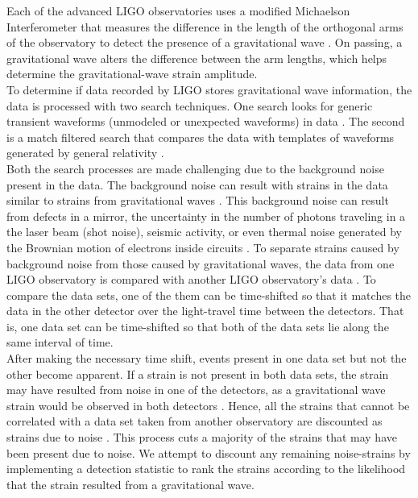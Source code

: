 \documentclass{article}
\begin{document}
 
 
 
 \indent Each of the advanced LIGO observatories uses a modified Michaelson Interferometer that measures the difference in the length of the orthogonal arms of the observatory to detect the presence of a gravitational wave \cite{DetectionPaper}. On passing, a gravitational wave alters the difference between the arm lengths, which helps determine the gravitational-wave strain amplitude. \\
  
  
  
  \indent To determine if data recorded by LIGO stores gravitational wave information, the data is processed with two search techniques. One search looks for generic transient waveforms (unmodeled or unexpected waveforms) in data \cite{Enia}. The second is a match filtered search that compares the data with templates of waveforms generated by general relativity \cite{Enia}.\\
  
  
  \indent Both the search processes are made challenging due to the background noise present in the data. The background noise can result with strains in the data similar to strains from gravitational waves \cite{DetectionPaper}. This background noise can result from defects in a mirror, the uncertainty in the number of photons traveling in a the laser beam (shot noise), seismic activity, or even thermal noise generated by the Brownian motion of electrons inside circuits \cite{RSmith}. To separate  strains caused by background noise from those caused by gravitational waves, the data from one LIGO observatory is compared with another LIGO observatory's data \cite{DetectionPaper}. To compare the data sets, one of the them can be time-shifted so that it matches the data in the other detector over the light-travel time between the detectors. That is, one data set can be time-shifted so that both of the data sets lie along the same interval of time.\\
  
  After making the necessary time shift, events present in one data set but not the other become apparent. If a strain is not present in both data sets, the strain may have resulted from noise in one of the detectors, as a gravitational wave strain would be observed in both detectors \cite{DetectionPaper}. Hence, all the strains that cannot be correlated with a data set taken from another observatory are discounted as strains due to noise \cite{DetectionPaper}. This process cuts a majority of the strains that may have been present due to noise\cite{DetectionPaper}. We attempt to discount any remaining noise-strains by implementing a detection statistic to rank the strains according to the likelihood that the strain resulted from a gravitational wave.\\
  
\end{document}

